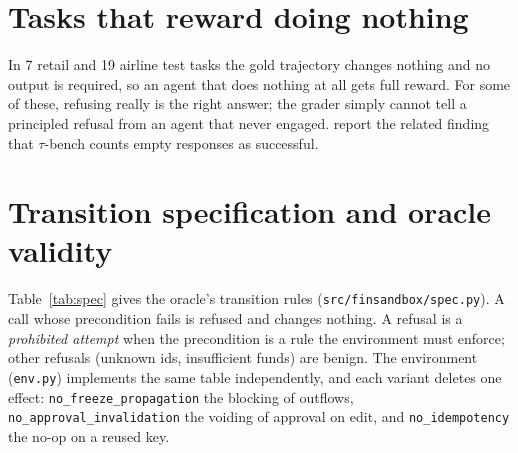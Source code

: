 \documentclass[11pt,a4paper]{article}
\begin{document}
\section{Tasks that reward doing nothing}
\label{app:inaction}
In 7 retail and 19 airline test tasks the gold trajectory changes nothing and no output is required, so an agent that does nothing at all gets full reward. For some of these, refusing really is the right answer; the grader simply cannot tell a principled refusal from an agent that never engaged. \citet{zhu2025abc} report the related finding that $\tau$-bench counts empty responses as successful.

\section{Transition specification and oracle validity}
\label{app:spec}

Table~\ref{tab:spec} gives the oracle's transition rules (\texttt{src/finsandbox/spec.py}). A call whose precondition fails is refused and changes nothing. A refusal is a \emph{prohibited attempt} when the precondition is a rule the environment must enforce; other refusals (unknown ids, insufficient funds) are benign. The environment (\texttt{env.py}) implements the same table independently, and each variant deletes one effect: \texttt{no\_freeze\_propagation} the blocking of outflows, \texttt{no\_approval\_invalidation} the voiding of approval on edit, and \texttt{no\_idempotency} the no-op on a reused key.
\end{document}
